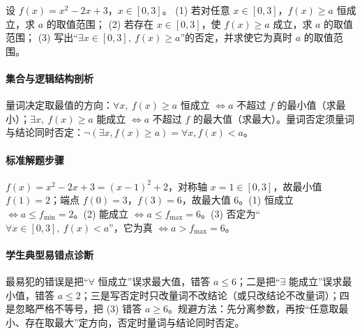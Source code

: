 \begin{problem}
设 $f(x)=x^2-2x+3$，$x\in[0,3]$。
(1) 若对任意 $x\in[0,3]$，$f(x)\geq a$ 恒成立，求 $a$ 的取值范围；
(2) 若存在 $x\in[0,3]$，使 $f(x)\geq a$ 成立，求 $a$ 的取值范围；
(3) 写出“$\exists x\in[0,3],\ f(x)\geq a$”的否定，并求使它为真时 $a$ 的取值范围。
\end{problem}
\begin{solution}
\paragraph{集合与逻辑结构剖析}
量词决定取最值的方向：$\forall x,\ f(x)\geq a$ 恒成立 $\iff a$ 不超过 $f$ 的最小值（求最小）；$\exists x,\ f(x)\geq a$ 能成立 $\iff a$ 不超过 $f$ 的最大值（求最大）。量词否定须量词与结论同时否定：$\neg(\exists x, f(x)\geq a)=\forall x, f(x)<a$。
\paragraph{标准解题步骤}
$f(x)=x^2-2x+3=(x-1)^2+2$，对称轴 $x=1\in[0,3]$，故最小值 $f(1)=2$；端点 $f(0)=3$，$f(3)=6$，故最大值 $6$。(1) 恒成立 $\iff a\leq f_{\min}=2$。(2) 能成立 $\iff a\leq f_{\max}=6$。(3) 否定为“$\forall x\in[0,3],\ f(x)<a$”，它为真 $\iff a>f_{\max}=6$。
\paragraph{学生典型易错点诊断}
最易犯的错误是把“$\forall$ 恒成立”误求最大值，错答 $a\leq6$；二是把“$\exists$ 能成立”误求最小值，错答 $a\leq2$；三是写否定时只改量词不改结论（或只改结论不改量词）；四是忽略严格不等号，把 (3) 错答 $a\geq6$。规避方法：先分离参数，再按“任意取最小、存在取最大”定方向，否定时量词与结论同时否定。
\end{solution}

